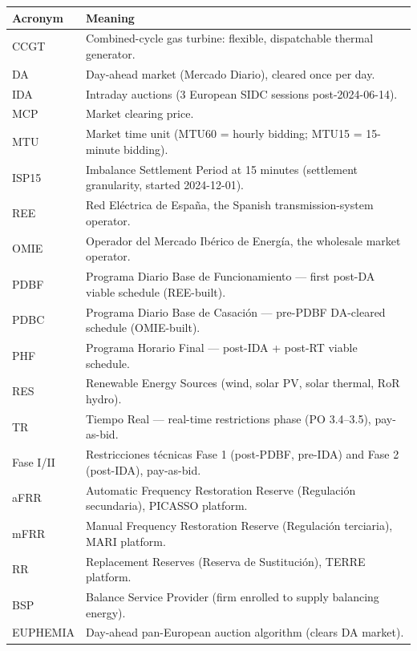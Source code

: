 \documentclass[11pt,a4paper]{article}
\begin{document}
\bigskip
\noindent
\renewcommand{\arraystretch}{1.15}
\begin{tabular}{@{}p{2.0cm} p{13.5cm}@{}}
\toprule
\textbf{Acronym} & \textbf{Meaning} \\
\midrule
CCGT     & Combined-cycle gas turbine: flexible, dispatchable thermal generator. \\
DA       & Day-ahead market (Mercado Diario), cleared once per day. \\
IDA      & Intraday auctions (3 European SIDC sessions post-2024-06-14). \\
MCP      & Market clearing price. \\
MTU      & Market time unit (MTU60 = hourly bidding; MTU15 = 15-minute bidding). \\
ISP15    & Imbalance Settlement Period at 15 minutes (settlement granularity, started 2024-12-01). \\
REE      & Red Eléctrica de España, the Spanish transmission-system operator. \\
OMIE     & Operador del Mercado Ibérico de Energía, the wholesale market operator. \\
PDBF     & Programa Diario Base de Funcionamiento — first post-DA viable schedule (REE-built). \\
PDBC     & Programa Diario Base de Casación — pre-PDBF DA-cleared schedule (OMIE-built). \\
PHF      & Programa Horario Final — post-IDA + post-RT viable schedule. \\
RES      & Renewable Energy Sources (wind, solar PV, solar thermal, RoR hydro). \\
TR       & Tiempo Real — real-time restrictions phase (PO 3.4--3.5), pay-as-bid. \\
Fase I/II & Restricciones técnicas Fase 1 (post-PDBF, pre-IDA) and Fase 2 (post-IDA), pay-as-bid. \\
aFRR     & Automatic Frequency Restoration Reserve (Regulación secundaria), PICASSO platform. \\
mFRR     & Manual Frequency Restoration Reserve (Regulación terciaria), MARI platform. \\
RR       & Replacement Reserves (Reserva de Sustitución), TERRE platform. \\
BSP      & Balance Service Provider (firm enrolled to supply balancing energy). \\
EUPHEMIA & Day-ahead pan-European auction algorithm (clears DA market). \\
\bottomrule
\end{tabular}
\renewcommand{\arraystretch}{1.0}
\end{document}
